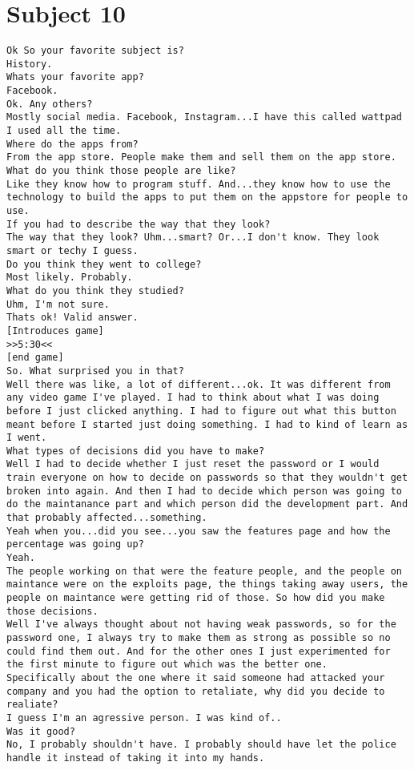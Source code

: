\clearpage\section*{Subject 10}
\begin{lstlisting}
Ok So your favorite subject is?
History.
Whats your favorite app?
Facebook.
Ok. Any others?
Mostly social media. Facebook, Instagram...I have this called wattpad I used all the time.
Where do the apps from?
From the app store. People make them and sell them on the app store.
What do you think those people are like?
Like they know how to program stuff. And...they know how to use the technology to build the apps to put them on the appstore for people to use.
If you had to describe the way that they look?
The way that they look? Uhm...smart? Or...I don't know. They look smart or techy I guess.
Do you think they went to college?
Most likely. Probably.
What do you think they studied?
Uhm, I'm not sure.
Thats ok! Valid answer. 
[Introduces game]
>>5:30<<
[end game]
So. What surprised you in that?
Well there was like, a lot of different...ok. It was different from any video game I've played. I had to think about what I was doing before I just clicked anything. I had to figure out what this button meant before I started just doing something. I had to kind of learn as I went.
What types of decisions did you have to make?
Well I had to decide whether I just reset the password or I would train everyone on how to decide on passwords so that they wouldn't get broken into again. And then I had to decide which person was going to do the maintanance part and which person did the development part. And that probably affected...something.
Yeah when you...did you see...you saw the features page and how the percentage was going up?
Yeah.
The people working on that were the feature people, and the people on maintance were on the exploits page, the things taking away users, the people on maintance were getting rid of those. So how did you make those decisions. 
Well I've always thought about not having weak passwords, so for the password one, I always try to make them as strong as possible so no could find them out. And for the other ones I just experimented for the first minute to figure out which was the better one.
Specifically about the one where it said someone had attacked your company and you had the option to retaliate, why did you decide to realiate?
I guess I'm an agressive person. I was kind of..
Was it good?
No, I probably shouldn't have. I probably should have let the police handle it instead of taking it into my hands.

\end{lstlisting}
